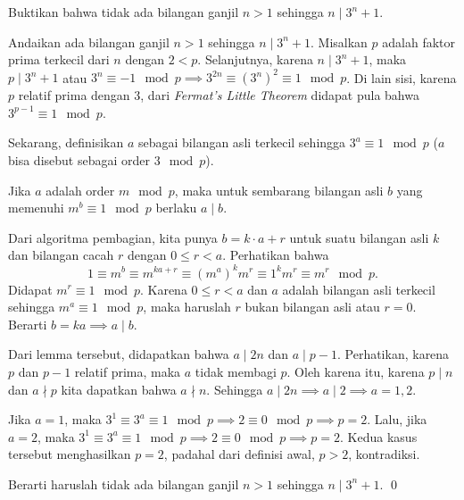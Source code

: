 \documentclass[11pt]{scrartcl}
\begin{document}
	\newpage
	\begin{soalbaru}
		Buktikan bahwa tidak ada bilangan ganjil $n > 1$ sehingga $n \mid 3^n+1$.\\[-10pt]
	\end{soalbaru}
	\begin{solusi}
	Andaikan ada bilangan ganjil $n>1$ sehingga $n \mid 3^n+1$.
	Misalkan $p$ adalah faktor prima terkecil dari $n$ dengan $2< p$. Selanjutnya, karena $n \mid 3^n+1$, maka $p \mid 3^n+1$ atau $3^n \equiv -1 \mod p \implies 3^{2n} \equiv (3^n)^2 \equiv 1 \mod p$. Di lain sisi, karena $p$ relatif prima dengan 3, dari \textit{ Fermat's Little Theorem }didapat pula bahwa $3^{p-1} \equiv 1 \mod p$.
	
	Sekarang, definisikan $a$ sebagai bilangan asli terkecil sehingga $3^a \equiv 1 \mod p$ ($a$ bisa disebut sebagai order $3 \mod p$). 
	\begin{lemmarev}
		Jika $a$ adalah order $m\mod p$, maka untuk sembarang bilangan asli $b$ yang memenuhi $m^b \equiv 1 \mod p$ berlaku $a\mid b$.
		\begin{buktilemma}
		Dari algoritma pembagian, kita punya $b=k\cdot a + r$ untuk suatu bilangan asli $k$ dan bilangan cacah $r$ dengan $0 \le r < a$. Perhatikan bahwa $$1 \equiv m^b \equiv m^{ka+r} \equiv (m^a)^km^r \equiv 1^km^r \equiv m^r \mod p.$$ Didapat $m^r \equiv 1 \mod p$. Karena $0 \le r < a$ dan $a$ adalah bilangan asli terkecil sehingga $m^a \equiv 1 \mod p$, maka haruslah $r$ bukan bilangan asli atau $r=0$. Berarti $b=ka \implies a \mid b$.
		\end{buktilemma}
	\end{lemmarev}
	Dari lemma tersebut, didapatkan bahwa $a \mid 2n$ dan $a \mid p-1$. Perhatikan, karena $p$ dan $p-1$ relatif prima, maka $a$ tidak membagi $p$. Oleh karena itu, karena $p \mid n$ dan $a \nmid p$ kita dapatkan bahwa $a \nmid n$. Sehingga $a \mid 2n \implies a \mid 2 \implies a=1,2$.
	
	Jika $a=1$, maka $3^1 \equiv 3^a \equiv 1 \mod p \implies 2 \equiv 0 \mod p \implies p = 2$. Lalu, jika $a=2$, maka $3^1 \equiv 3^a \equiv 1 \mod p \implies 2 \equiv 0 \mod p \implies p = 2$. Kedua kasus tersebut menghasilkan $p=2$, padahal dari definisi awal, $p > 2$, kontradiksi.
	
	Berarti haruslah tidak ada bilangan ganjil $n>1$ sehingga $n \mid 3^n+1$. \qed
	\end{solusi}
\end{document}
